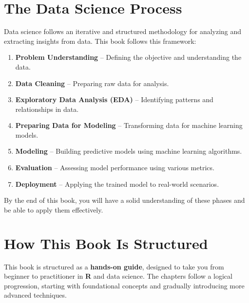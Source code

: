 \documentclass[
]{book}
\providecommand{\tightlist}{%
  \setlength{\itemsep}{0pt}\setlength{\parskip}{0pt}}
\theoremstyle{definition}
\theoremstyle{definition}
\theoremstyle{definition}
\theoremstyle{definition}
\theoremstyle{remark}
\begin{document}
\section*{The Data Science Process}\label{the-data-science-process}

Data science follows an iterative and structured methodology for analyzing and extracting insights from data. This book follows this framework:

\begin{enumerate}
\def\labelenumi{\arabic{enumi}.}
\tightlist
\item
  \textbf{Problem Understanding} -- Defining the objective and understanding the data.\\
\item
  \textbf{Data Cleaning} -- Preparing raw data for analysis.\\
\item
  \textbf{Exploratory Data Analysis (EDA)} -- Identifying patterns and relationships in data.\\
\item
  \textbf{Preparing Data for Modeling} -- Transforming data for machine learning models.\\
\item
  \textbf{Modeling} -- Building predictive models using machine learning algorithms.\\
\item
  \textbf{Evaluation} -- Assessing model performance using various metrics.\\
\item
  \textbf{Deployment} -- Applying the trained model to real-world scenarios.
\end{enumerate}

By the end of this book, you will have a solid understanding of these phases and be able to apply them effectively.

\section*{How This Book Is Structured}\label{how-this-book-is-structured}

This book is structured as a \textbf{hands-on guide}, designed to take you from beginner to practitioner in \textbf{R} and data science. The chapters follow a logical progression, starting with foundational concepts and gradually introducing more advanced techniques.
\end{document}

